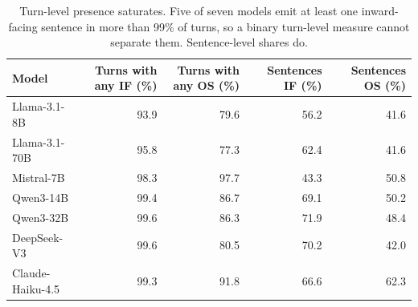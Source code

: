 \begin{table}[t]
\centering
\small
\caption{Turn-level presence saturates. Five of seven models emit at least one inward-facing sentence in more than 99\% of turns, so a binary turn-level measure cannot separate them. Sentence-level shares do.}
\label{tab:saturation}
\begin{tabular}{lrrrr}
\toprule
Model & Turns with any IF (\%) & Turns with any OS (\%) & Sentences IF (\%) & Sentences OS (\%) \\
\midrule
Llama-3.1-8B & 93.9 & 79.6 & 56.2 & 41.6 \\
Llama-3.1-70B & 95.8 & 77.3 & 62.4 & 41.6 \\
Mistral-7B & 98.3 & 97.7 & 43.3 & 50.8 \\
Qwen3-14B & 99.4 & 86.7 & 69.1 & 50.2 \\
Qwen3-32B & 99.6 & 86.3 & 71.9 & 48.4 \\
DeepSeek-V3 & 99.6 & 80.5 & 70.2 & 42.0 \\
Claude-Haiku-4.5 & 99.3 & 91.8 & 66.6 & 62.3 \\
\bottomrule
\end{tabular}
\end{table}
